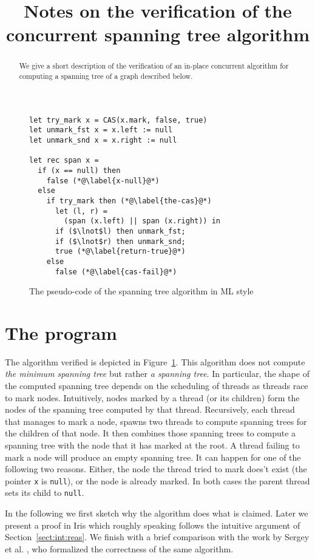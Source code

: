 \documentclass[]{scrartcl}
\title{Notes on the verification of the concurrent spanning tree algorithm}
\def\MyMLe{\lstinline[language=MyML, basicstyle=\small\ttfamily, mathescape=true]}
\begin{document}
\maketitle

\begin{abstract}
We give a short description of the verification of an
in-place concurrent algorithm for computing
a spanning tree of a graph described below.
\end{abstract}

\begin{figure}
\begin{lstlisting}[mathescape=true, language=MyML]
let try_mark x = CAS(x.mark, false, true)
let unmark_fst x = x.left := null
let unmark_snd x = x.right := null

let rec span x =
  if (x == null) then
    false (*@\label{x-null}@*)
  else
    if try_mark then (*@\label{the-cas}@*)
      let (l, r) =
        (span (x.left) || span (x.right)) in
      if ($\lnot$l) then unmark_fst;
      if ($\lnot$r) then unmark_snd;
      true (*@\label{return-true}@*)
    else
      false (*@\label{cas-fail}@*)
\end{lstlisting}
\caption{The pseudo-code of the spanning tree algorithm in ML style}
\label{fig:code}
\end{figure}

\section{The program}
The algorithm verified is depicted in Figure~\ref{fig:code}.
This algorithm does not compute \emph{the minimum
spanning tree} but rather \emph{a spanning tree}.
In particular, the shape of the computed spanning tree depends on the
scheduling of threads as threads race to mark nodes.
Intuitively, nodes marked by a thread (or its children) form the nodes of
the spanning tree computed by that thread.
Recursively, each thread that manages to mark a node, spawns two
threads to compute spanning trees for the children of that node. 
It then combines those spanning trees to compute a spanning tree with
the node that it has marked at the root.
A thread failing to mark a node will produce an empty
spanning tree.
It can happen for one of the following two reasons.
Either, the node the thread tried to mark does't exist
(the pointer \MyMLe{x} is \MyMLe{null}),
or the node is already marked.
In both cases the parent thread sets its child to \MyMLe{null}.

In the following we first sketch why the algorithm
does what is claimed.
Later we present a proof in Iris which roughly speaking follows the
intuitive argument of Section~\ref{sect:int:reas}.
We finish with a brief comparison with the work by Sergey et al. \cite{Sergey:2015:MVF:2737924.2737964}, who formalized
the correctness of the same algorithm.
\end{document}
